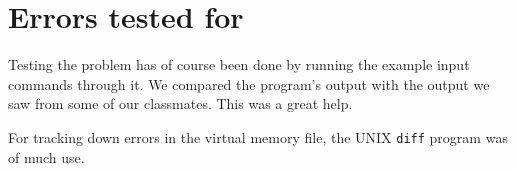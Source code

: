 \documentclass[11pt]{article}
\begin{document}
\section{Errors tested for}

Testing the problem has of course been done by running the example input commands through it. We compared the program's output with the output we saw from some of our classmates. This was a great help.

For tracking down errors in the virtual memory file, the UNIX \verb|diff| program was of much use.
\end{document}
